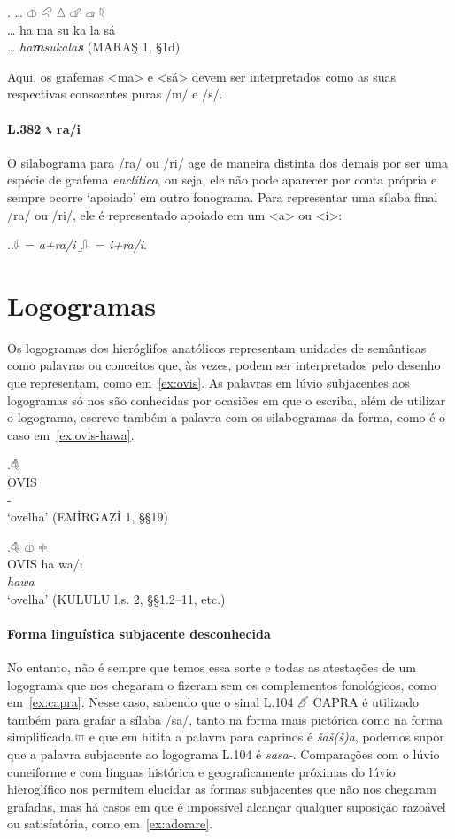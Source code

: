 \exg. \ldots{} \Large 𔓷 \Large 𔒅 \Large 𔖢 \Large 𔗧 \Large 𔓊 \Large 𔗦\\
\ldots{} ha ma su ka la sá\\
\ldots{} \emph{ha\textbf{m}sukala\textbf{s}} (MARAŞ 1, §1d)

Aqui, os grafemas <ma> e <sá> devem ser interpretados como as suas respectivas
consoantes puras /m/ e /s/.

\paragraph{L.382 𔖲 ra\slash{}i} O silabograma para /ra/ ou /ri/ age de maneira
distinta dos demais por ser uma espécie de grafema \emph{enclítico}, ou seja,
ele não pode aparecer por conta própria e sempre ocorre `apoiado' em outro
fonograma.
Para representar uma sílaba final /ra/ ou /ri/, ele é representado apoiado em um
<a> ou <i>:

\ex.\a.{\Large 𔗸} = \emph{a+ra\slash{}i}
\b.{\Large 𔓰} = \emph{i+ra\slash{}i}.


\section{Logogramas}

Os logogramas dos hieróglifos anatólicos representam unidades de semânticas
como palavras ou conceitos que, às vezes, podem ser interpretados pelo
desenho que representam, como em~\ref{ex:ovis}.
As palavras em lúvio subjacentes aos logogramas só nos são conhecidas por
ocasiões em que o escriba, além de utilizar o logograma, escreve também a
palavra com os silabogramas da forma, como é o caso em~\ref{ex:ovis-hawa}.

\exg.\label{ex:ovis}\Large 𔒇\\
OVIS\\
-\\
`ovelha' (EMİRGAZİ 1, §§19)

\exg.\label{ex:ovis-hawa}\Large 𔒇 \Large 𔓷 \Large 𔗬\\
OVIS ha wa/i\\
\emph{hawa}\\
`ovelha' (KULULU l.s. 2, §§1.2–11, etc.)


\paragraph{Forma linguística subjacente desconhecida}
No entanto, não é sempre que temos essa sorte e todas as atestações de um
logograma que nos chegaram o fizeram sem os complementos fonológicos, como
em~\ref{ex:capra}. Nesse caso, sabendo que o sinal L.104 𔑶 CAPRA é utilizado
também para grafar a sílaba /sa/, tanto na forma mais pictórica como na forma
simplificada 𔑷 e que em hitita a palavra para caprinos é \emph{šaš{(š)}a}, podemos
supor que a palavra subjacente ao logograma L.104 é \emph{sasa-}.
Comparações com o lúvio cuneiforme e com línguas histórica e
geograficamente próximas do lúvio hieroglífico nos permitem elucidar as formas
subjacentes que não nos chegaram grafadas, mas há casos em que é impossível
alcançar qualquer suposição razoável ou satisfatória, como em~\ref{ex:adorare}.

